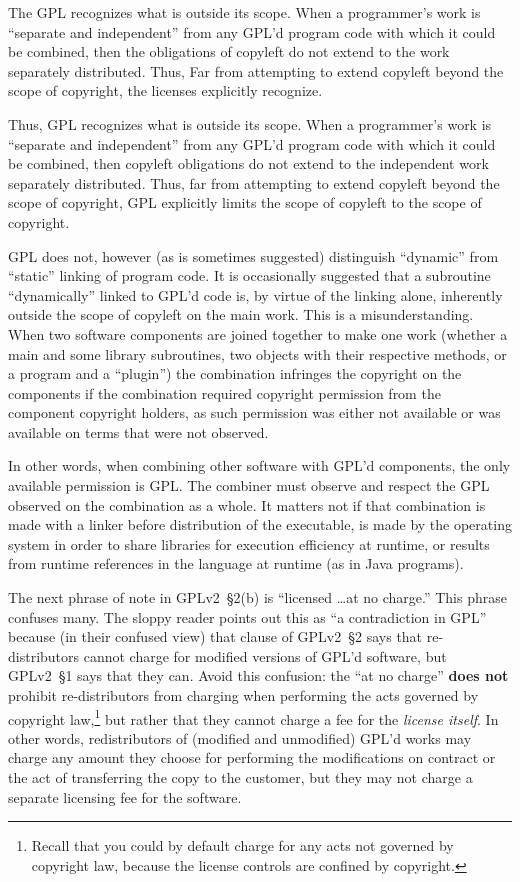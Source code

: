 The GPL  recognizes what is outside its scope.  When a programmer's work is
``separate and independent'' from any GPL'd program code with which it could be
combined, then the obligations of copyleft do not extend to the work
separately distributed.  Thus, Far from attempting to extend copyleft beyond the
scope of copyright, the licenses explicitly recognize.

Thus, GPL recognizes what is outside its scope.  When a programmer's work is
``separate and independent'' from any GPL'd program code with which it could
be combined, then copyleft obligations do not extend to the independent work
separately distributed.  Thus, far from attempting to extend copyleft beyond
the scope of copyright, GPL explicitly limits the scope of copyleft to the
scope of copyright.

GPL does not, however (as is sometimes suggested) distinguish ``dynamic''
from ``static'' linking of program code.  It is occasionally suggested that a
subroutine ``dynamically'' linked to GPL'd code is, by virtue of the linking
alone, inherently outside the scope of copyleft on the main work.  This is a
misunderstanding.  When two software components are joined together to make
one work (whether a main and some library subroutines, two objects with their
respective methods, or a program and a ``plugin'') the combination infringes
the copyright on the components if the combination required copyright
permission from the component copyright holders, as such permission was
either not available or was available on terms that were not observed.

In other words, when combining other software with GPL'd components, the only
available permission is GPL.  The combiner must observe and respect the GPL
observed on the combination as a whole.  It matters not if that combination
is made with a linker before distribution of the executable, is made by the
operating system in order to share libraries for execution efficiency at
runtime, or results from runtime references in the language at runtime (as in
Java programs).

\medskip

\label{GPLv2s2-at-no-charge}
The next phrase of note in GPLv2~\S2(b) is ``licensed \ldots at no charge.''
This phrase  confuses many.  The sloppy reader points out this as ``a
contradiction in GPL'' because (in their confused view) that clause of GPLv2~\S2 says that re-distributors cannot
charge for modified versions of GPL'd software, but GPLv2~\S1 says that
they can.  Avoid this confusion: the ``at no charge'' \textbf{does not} prohibit re-distributors from
charging when performing the acts governed by copyright
law,\footnote{Recall that you could by default charge for any acts not
governed by copyright law, because the license controls are confined
by copyright.} but rather that they cannot charge a fee for the
\emph{license itself}.  In other words, redistributors of (modified
and unmodified) GPL'd works may charge any amount they choose for
performing the modifications on contract or the act of transferring
the copy to the customer, but they may not charge a separate licensing
fee for the software.

